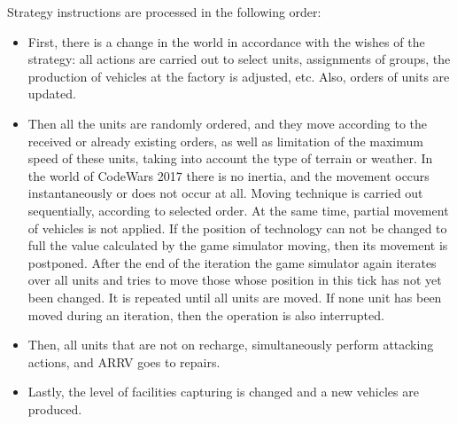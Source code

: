 Strategy instructions are processed in the following order:
\begin{itemize}
    \item First, there is a change in the world in accordance with the wishes of the strategy: all actions are carried out to select units, assignments
        of groups, the production of vehicles at the factory is adjusted, etc. Also, orders of units are updated.
    \item Then all the units are randomly ordered, and they move according to the received or already existing
        orders, as well as limitation of the maximum speed of these units, taking into account the type of terrain or weather. In the world of CodeWars 2017 there is no
        inertia, and the movement occurs instantaneously or does not occur at all. Moving technique is carried out sequentially, according to
        selected order. At the same time, partial movement of vehicles is not applied. If the position of technology can not be changed to full
        the value calculated by the game simulator moving\footnotemark[3], then its movement is postponed. After the end of the iteration
        the game simulator again iterates over all units and tries to move those whose position in this tick has not yet been changed.
        It is repeated until all units are moved. If none unit has been moved during an iteration, then
        the operation is also interrupted.
    \item Then, all units that are not on recharge, simultaneously perform attacking actions, and ARRV goes to repairs.
    \item Lastly, the level of facilities capturing is changed and a new vehicles are produced.
\end{itemize}



